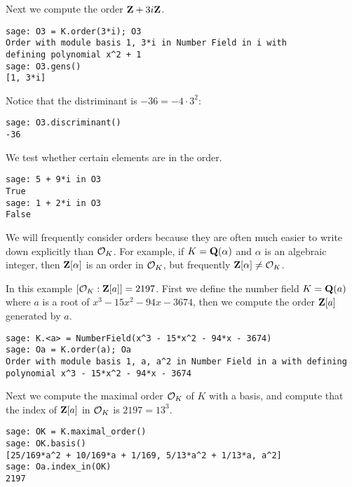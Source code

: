 \noindent Next we compute the order $\mathbf{Z} + 3i \mathbf{Z}$.
\begin{verbatim}
sage: O3 = K.order(3*i); O3
Order with module basis 1, 3*i in Number Field in i with 
defining polynomial x^2 + 1
sage: O3.gens()
[1, 3*i]
\end{verbatim}%

\noindent Notice that the distriminant is $-36 = -4 \cdot 3^2$:
\begin{verbatim}
sage: O3.discriminant()
-36
\end{verbatim}%

\noindent We test whether certain elements are in the order.
\begin{verbatim}
sage: 5 + 9*i in O3
True
sage: 1 + 2*i in O3
False
\end{verbatim}

We will frequently consider orders because they are often much easier
to write down explicitly than $\mathcal{O}_K$.  For example, if $K=\mathbf{Q}(\alpha)$
and $\alpha$ is an algebraic integer, then $\mathbf{Z}[\alpha]$ is an order in
$\mathcal{O}_K$, but frequently $\mathbf{Z}[\alpha]\neq \mathcal{O}_K$.

\begin{example}
In this example $[\mathcal{O}_K : \mathbf{Z}[a]] = 2197$.  First we define
the number field $K=\mathbf{Q}(a)$ where $a$ is a root of $x^3 - 15 x^2 - 94 x - 3674$,
then we compute the order $\mathbf{Z}[a]$ generated by $a$.
\begin{verbatim}
sage: K.<a> = NumberField(x^3 - 15*x^2 - 94*x - 3674)
sage: Oa = K.order(a); Oa
Order with module basis 1, a, a^2 in Number Field in a with defining 
polynomial x^3 - 15*x^2 - 94*x - 3674
\end{verbatim}%

\noindent Next we compute the maximal order $\mathcal{O}_K$ of $K$ with a basis, and
compute that the index of $\mathbf{Z}[a]$ in $\mathcal{O}_K$ is $2197=13^3$.
\begin{verbatim}
sage: OK = K.maximal_order()
sage: OK.basis()
[25/169*a^2 + 10/169*a + 1/169, 5/13*a^2 + 1/13*a, a^2]
sage: Oa.index_in(OK)
2197
\end{verbatim}
\end{example}

